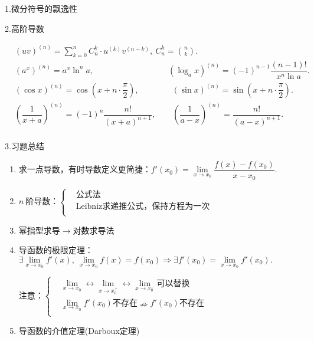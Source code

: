 \documentclass[UTF8]{ctexart}
\newcommand\no{\noindent}
\newcommand\dis{\displaystyle}
\newcommand\limit{\dis\lim\limits}
\newcommand\sumkn{\dis\sum\limits_{k=0}^n}
\begin{document}
\begin{spacing}{2}
\no1.微分符号的飘逸性

\no2.高阶导数

$\begin{aligned}
&(uv)^{(n)}=\sumkn C_{n}^k\cdot u^{(k)}v^{(n-k)},\  C_{n}^k=\binom{n}{k}.\\
&(a^x)^{(n)}=a^x\ln^n a,\qquad\qquad\qquad\qquad\quad (\log_a x)^{(n)}=(-1)^{n-1}
\dfrac{(n-1)!}{x^n\ln a}.\\
&(\cos x)^{(n)}=\cos\left(x+n\cdot\dfrac{\pi}{2}\right),\qquad\qquad
(\sin x)^{(n)}=\sin\left(x+n\cdot\dfrac{\pi}{2}\right).\\
&\left(\dfrac{1}{x+a}\right)^{(n)}=(-1)^n\dfrac{n!}{(x+a)^{n+1}}, \qquad
\left(\dfrac{1}{a-x}\right)^{(n)}=\dfrac{n!}{(a-x)^{n+1}}.\\
\end{aligned}$

\vspace{0.5cm}

\no3.习题总结

\begin{enumerate}[itemindent=1.4em, label=(\arabic*)]

\item 求一点导数，有时导数定义更简捷：$f'(x_0)=\limit_{x\to x_0}\dfrac{f(x)-f(x_0)}{x-x_0}.$

\item $n\ \text{阶导数：}\left\{\begin{aligned}
&\text{公式法}\\
&\text{Leibniz求递推公式，保持方程为一次}\\
\end{aligned}\right.$

\item 幂指型求导$\longrightarrow$对数求导法

\item 导函数的极限定理：$\exists\limit_{x\to x_0}f'(x),\ \limit_{x\to x_0}f(x)=f(x_0)
\Longrightarrow\exists f'(x_0)=\limit_{x\to x_0}f'(x_0).$

$\text{注意：}\left\{\begin{aligned}
&\limit_{x\to x_0}\longleftrightarrow\limit_{x\to x_0^+}
\longleftrightarrow\limit_{x\to x_0^-}\text{可以替换}\\
&\limit_{x\to x_0}f'(x_0)\text{不存在}\nRightarrow f'(x_0)\text{不存在}\\
\end{aligned}\right.$

\item 导函数的介值定理(Darboux定理)


\end{enumerate}
\end{spacing}
\end{document}
